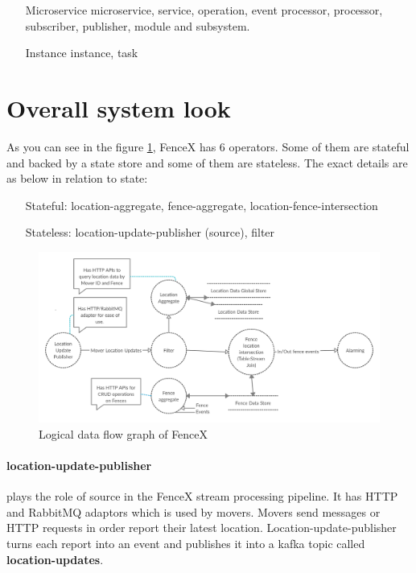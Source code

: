 \documentclass[a4]{report}
\begin{document}
        \begin{itemize}
            \item[Microservice] microservice, service, operation, event processor,  processor, subscriber, publisher, module and subsystem.
            \item[Instance] instance, task
        \end{itemize}

        \section{Overall system look}
        As you can see in the figure \ref{fig:logical-dfg}, FenceX has 6 operators.
        Some of them are stateful and backed by a state store and some of them are stateless.
        The exact details are as below in relation to state:

        \begin{itemize}
            \item[Stateful:] location-aggregate, fence-aggregate, location-fence-intersection
            \item[Stateless:] location-update-publisher (source), filter
        \end{itemize}

        \begin{figure}[ht]
            \caption{Logical data flow graph of FenceX}
            \label{fig:logical-dfg}
            \includegraphics[scale=0.2]{images/logical-data-flow-diagram.png}
        \end{figure}

        \paragraph{location-update-publisher} plays the role of source in the FenceX stream processing pipeline.
        It has HTTP and RabbitMQ adaptors which is used by movers.
        Movers send messages or HTTP requests in order report their latest location.
        Location-update-publisher turns each report into an event and publishes it into a kafka topic called
        \textbf{location-updates}.
\end{document}
